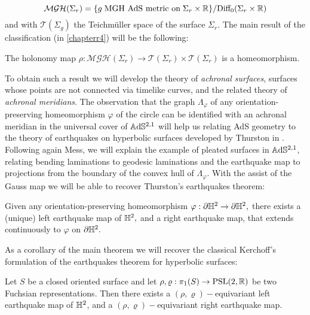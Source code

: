 \[
    \mathcal{MGH}(\Sigma_r)=\{g\;\text{MGH AdS metric on}\;\Sigma_r\times\mathbb{R}\}/\text{Diff}_0(\Sigma_r\times\mathbb{R})
\] and with $\mathcal{T}(\Sigma_g)$ the Teichmüller space of the surface $\Sigma_r.$ The main result of the classification (in \ref{chapterr4}) will be the following: 

\begin{theorem}
    The holonomy map $\rho:\mathcal{MGH}(\Sigma_r)\to\mathcal{T}(\Sigma_r)\times\mathcal{T}(\Sigma_r)$ is a homeomorphism.
\end{theorem}

To obtain such a result we will develop the theory of \textit{achronal surfaces}, surfaces whose points are not connected via timelike curves, and the related theory of \textit{achronal meridians}. The observation that the graph $\Lambda_\varphi$ of any orientation-preserving homeomorphism $\varphi$ of the circle can be identified with an achronal meridian in the universal cover of $\mathbb{A}\mathrm{d}\mathbb{S}^{2,1}$ will help us relating AdS geometry to the theory of earthquakes on hyperbolic surfaces developed by Thurston in \cite{thurston1986earthquakes}.\\ 

Following again Mess, we will explain the example of pleated surfaces in $\mathbb{A}\mathrm{d}\mathbb{S}^{2,1}$, relating bending laminations to geodesic laminations and the earthquake map to projections from the boundary of the convex hull of $\Lambda_\varphi$. With the assist of the Gauss map we will be able to recover Thurston's earthquakes theorem: 

\begin{theorem}
    Given any orientation-preserving homeomorphism $\varphi:\partial\mathbb{H}^2\to\partial\mathbb{H}^2,$ there exists a (unique) left earthquake map of $\mathbb{H}^2,$ and a right earthquake map, that extends continuously to $\varphi$ on $\partial\mathbb{H}^2.$
\end{theorem}

\noindent As a corollary of the main theorem we will recover the classical Kerchoff's formulation of the earthquakes theorem for hyperbolic surfaces: 

\begin{corollary}
    Let $S$ be a closed oriented surface and let $\rho,\varrho:\pi_1(S)\to\text{PSL}(2,\mathbb{R})$ be two Fuchsian representations. Then there exists a $(\rho,\varrho)-$equivariant left earthquake map of $\mathbb{H}^2$, and a $(\rho,\varrho)-$equivariant right earthquake map. 
\end{corollary}